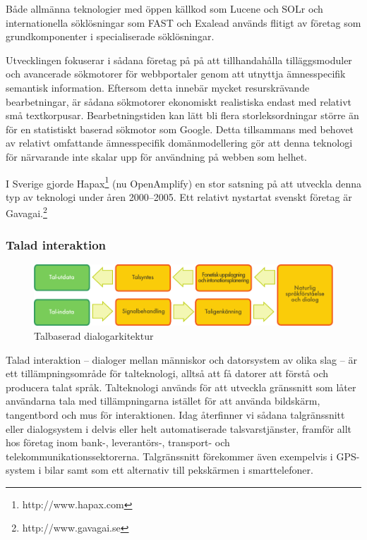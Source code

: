 \begin{multicols}{2}
Både allmänna teknologier med öppen källkod som Lucene och SOLr och
internationella söklösningar som FAST och Exalead används flitigt av
företag som grundkomponenter i specialiserade sök\-lös\-ning\-ar.

Utvecklingen fokuserar i sådana företag på på att tillhandahålla
tilläggsmoduler och avancerade sökmotorer för webbportaler genom att
utnyttja ämnesspecifik semantisk information. Eftersom detta innebär
mycket resurskrävande bearbetningar, är sådana sökmotorer ekonomiskt
realistiska endast med relativt små textkorpusar. Bearbetningstiden
kan lätt bli flera storleksordningar större än för en statistiskt
baserad sökmotor som Google. Detta tillsammans med behovet av relativt
omfattande ämnesspecifik domänmodellering gör att denna teknologi för
närvarande inte skalar upp för användning på webben som helhet.

I Sverige gjorde Hapax\footnote{http://www.hapax.com} (nu OpenAmplify)
en stor satsning på att utveckla denna typ av teknologi under åren
2000--2005. Ett relativt nystartat svenskt företag är
Gavagai.\footnote{http://www.gavagai.se}


\subsubsection{Talad interaktion}

\begin{figure}[htb]
  \center 
  \includegraphics[width=\textwidth]{../_media/swedish/simple_speech-based_dialogue_architecture}
  \caption{Talbaserad dialogarkitektur}
  \label{fig:dialoguearch_sv}
\end{figure}

Talad interaktion -- dialoger mellan människor och datorsystem av
olika slag -- är ett tillämpningsområde för talteknologi, alltså att
få datorer att förstå och producera talat språk. Talteknologi används
för att utveckla gränssnitt som låter användarna tala med
tillämpningarna istället för att använda bildskärm, tangentbord och
mus för interaktionen. Idag återfinner vi sådana talgränssnitt eller
dialogsystem i delvis eller helt automatiserade talsvarstjänster,
framför allt hos företag inom \mbox{bank-,} leverantörs-, transport-
och telekommunikationssektorerna. Talgränssnitt förekommer även
exempelvis i GPS-system i bilar samt som ett alternativ till
pek\-skärm\-en i smarttelefoner.


\end{multicols}
